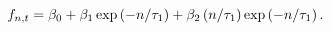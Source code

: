 \begin{equation} \label{eq:NSfwd}
	\fInst = \betaLT + \betaST \loadSTnsFwd + \betaMTns \loadMTnsFwd.
\end{equation}